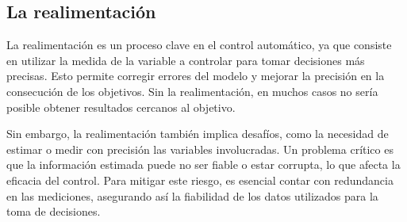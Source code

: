 \documentclass[journal, table]{IEEEtran}
\begin{document}
\subsection{La realimentación}%
\label{sec:La realimentación}

La realimentación es un proceso clave en el control automático, ya que consiste
en utilizar la medida de la variable a controlar para tomar decisiones más
precisas.
Esto permite corregir errores del modelo y mejorar la precisión en la
consecución de los objetivos.
Sin la realimentación, en muchos casos no sería posible obtener resultados
cercanos al objetivo.

Sin embargo, la realimentación también implica desafíos, como la necesidad de
estimar o medir con precisión las variables involucradas.
Un problema crítico es que la información estimada puede no ser fiable o estar
corrupta, lo que afecta la eficacia del control.
Para mitigar este riesgo, es esencial contar con redundancia en las mediciones,
asegurando así la fiabilidad de los datos utilizados para la toma de decisiones.

\printbibliography
\end{document}
